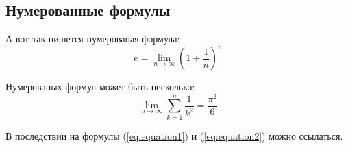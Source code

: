 \subsection{Нумерованные формулы} \label{subsect1_3_3}

А вот так пишется нумерованая формула:
\begin{equation}
  \label{eq:equation1}
  e = \lim_{n \to \infty} \left( 1+\frac{1}{n} \right) ^n
\end{equation}

Нумерованых формул может быть несколько:
\begin{equation}
  \label{eq:equation2}
  \lim_{n \to \infty} \sum_{k=1}^n \frac{1}{k^2} = \frac{\pi^2}{6}
\end{equation}

В последствии на формулы (\ref{eq:equation1}) и (\ref{eq:equation2}) можно ссылаться.


\clearpage
